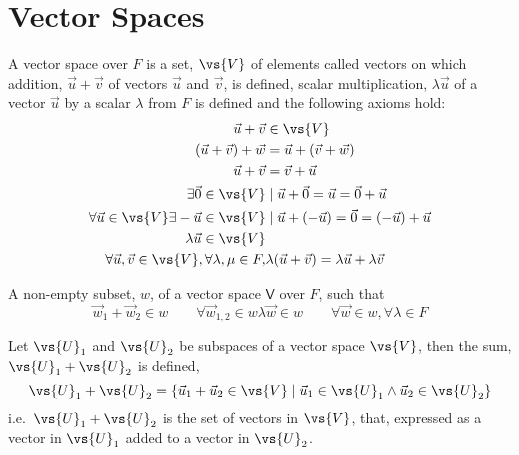 \section{Vector Spaces}
\label{sec:vectorspace}

\begin{definition}
  A vector space over $F$ is a set, $\vs{V}$ of elements called vectors on which addition, $\vec{u}+\vec{v}$ of vectors $\vec{u}$ and $\vec{v}$, is defined, scalar multiplication, $\lambda \vec{u}$ of a vector $\vec{u}$ by a scalar $\lambda$ from $F$ is defined and the following axioms hold:\\
\begin{subequations}
  \begin{align}
     \vec{u}+\vec{v} &\in \vs{V} \\
     (\vec{u} + \vec{v}) + \vec{w} &= \vec{u}+(\vec{v}+\vec{w}) \\
     \vec{u}+\vec{v} &= \vec{v}+\vec{u} \\
     \exists \vec{0} \in \vs{V} & \mid \vec{u}+\vec{0} = \vec{u}=\vec{0}+\vec{u} \\
     \forall \vec{u} \in \vs{V} \exists - \vec{u}\in \vs{V} & \mid \vec{u}+(-\vec{u}) = \vec{0} = (-\vec{u})+\vec{u} \\
     \lambda \vec{u} \in \vs{V} \\
     \forall \vec{u}, \vec{v} \in \vs{V} , \forall \lambda, \mu \in F, & \lambda(\vec{u}+\vec{v}) = \lambda \vec{u}+\lambda \vec{v}
  \end{align}
\end{subequations}
\end{definition}
\begin{definition}
  A non-empty subset, $w$, of a vector space $\mathsf{V}$ over $F$, such that
  \begin{subequations}
    \begin{equation}
      \label{eq:subspaceaddclose}
      \vec{w}_1 + \vec{w}_2 \in w \qquad \forall \vec{w}_{1,2} \in w
    \end{equation}
    \begin{equation}
      \label{eq:scalarmultsubsclose}
      \lambda \vec{w} \in w \qquad \forall \vec{w} \in w, \forall \lambda \in F
    \end{equation}
  \end{subequations}
\end{definition}
\begin{definition}
  Let $\vs{U}_1$ and $\vs{U}_2$ be subspaces of a vector space $\vs{V}$, then the sum, $\vs{U}_1 + \vs{U}_2$ is defined,
  \begin{equation}
    \label{eq:vectorspacesum}
    \vs{U}_1 + \vs{U}_2 = \left\{ \vec{u}_1 + \vec{u}_2 \in \vs{V} \mid \vec{u}_1 \in \vs{U}_1 \wedge \vec{u}_2 \in \vs{U}_2 \right\}
  \end{equation}
i.e.\ $\vs{U}_1 + \vs{U}_2$ is the set of vectors in $\vs{V}$, that, expressed as a vector in $\vs{U}_1$ added to a vector in $\vs{U}_2$.
\end{definition}
